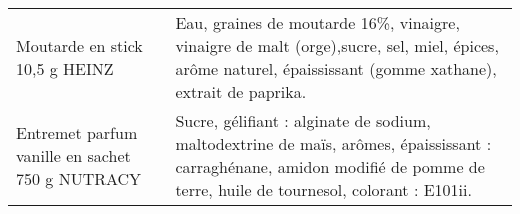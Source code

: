 \begin{longtable}{p{5cm}p{10cm}}
                                                                           Moutarde en stick 10,5 g HEINZ &                                                                                                                                                                                                                                                                                                                                                                                                                                                                                                                                                                                                                                                                                                                                                                                                                                                                               Eau, graines de moutarde 16\%, vinaigre, vinaigre de malt (orge),sucre, sel, miel, épices, arôme naturel, épaississant (gomme xathane), extrait de paprika. \\
                                                          Entremet parfum vanille en sachet 750 g NUTRACY &                                                                                                                                                                                                                                                                                                                                                                                                                                                                                                                                                                                                                                                                                                                                                                                                                                                              Sucre, gélifiant : alginate de sodium, maltodextrine de maïs, arômes, épaississant : carraghénane, amidon modifié de pomme de terre, huile de tournesol, colorant : E101ii. \\

\end{longtable}
